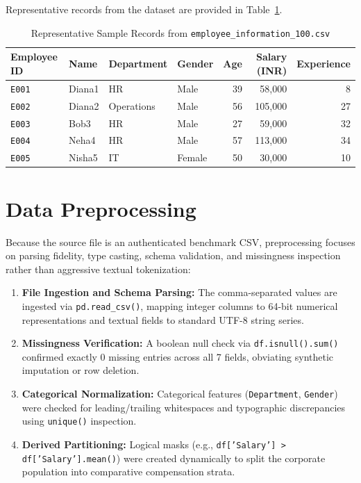 \documentclass[12pt,a4paper]{report}
\begin{document}
Representative records from the dataset are provided in Table~\ref{tab:exp1_sample}.
\begin{table}[H]
\centering
\small
\caption{Representative Sample Records from \texttt{employee\_information\_100.csv}}
\label{tab:exp1_sample}
\begin{tabular}{llllrrr}
\toprule
\textbf{Employee ID} & \textbf{Name} & \textbf{Department} & \textbf{Gender} & \textbf{Age} & \textbf{Salary (INR)} & \textbf{Experience} \\
\midrule
\texttt{E001} & Diana1 & HR & Male & 39 & 58,000 & 8 \\
\texttt{E002} & Diana2 & Operations & Male & 56 & 105,000 & 27 \\
\texttt{E003} & Bob3 & HR & Male & 27 & 59,000 & 32 \\
\texttt{E004} & Neha4 & HR & Male & 57 & 113,000 & 34 \\
\texttt{E005} & Nisha5 & IT & Female & 50 & 30,000 & 10 \\
\bottomrule
\end{tabular}
\end{table}

\section{Data Preprocessing}
Because the source file is an authenticated benchmark CSV, preprocessing focuses on parsing fidelity, type casting, schema validation, and missingness inspection rather than aggressive textual tokenization:
\begin{enumerate}
    \item \textbf{File Ingestion and Schema Parsing:} The comma-separated values are ingested via \texttt{pd.read\_csv()}, mapping integer columns to 64-bit numerical representations and textual fields to standard UTF-8 string series.
    \item \textbf{Missingness Verification:} A boolean null check via \texttt{df.isnull().sum()} confirmed exactly 0 missing entries across all 7 fields, obviating synthetic imputation or row deletion.
    \item \textbf{Categorical Normalization:} Categorical features (\texttt{Department}, \texttt{Gender}) were checked for leading/trailing whitespaces and typographic discrepancies using \texttt{unique()} inspection.
    \item \textbf{Derived Partitioning:} Logical masks (e.g., \texttt{df['Salary'] > df['Salary'].mean()}) were created dynamically to split the corporate population into comparative compensation strata.
\end{enumerate}
\end{document}
